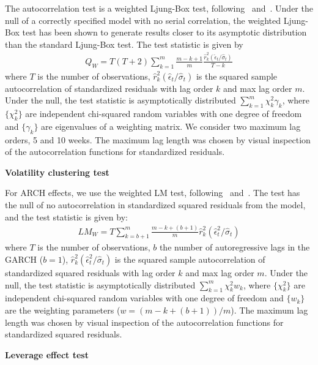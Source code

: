 The autocorrelation test is a weighted Ljung-Box test, following~\textcite{FisherGallagher2012} and~\textcite{LjungBox1978}. Under the null of a correctly specified model with no serial correlation, the weighted Ljung-Box test has been shown to generate results closer to its asymptotic distribution than the standard Ljung-Box test. The test statistic is given by
\begin{align}
  Q_W = T (T+2) \sum\limits^m_{k = 1} \frac{m-k+1}{m} \frac{\hat{r}_{k}^{2} (\hat{\epsilon}_{t} / \hat{\sigma}_{t})}{T-k}
\end{align}
where $T$ is the number of observations, $\hat{r}^{2}_{k} ( \hat{\epsilon}_{t} / \hat{\sigma}_{t} )$ is the squared sample autocorrelation of standardized residuals with lag order $k$ and max lag order $m$. Under the null, the test statistic is asymptotically distributed $\sum\limits^m_{k = 1} \chi^2_k \gamma_k$, where $\{\chi^2_k\}$ are independent chi-squared random variables with one degree of freedom and $\{\gamma_k\}$ are eigenvalues of a weighting matrix. We consider two maximum lag orders, 5 and 10 weeks. The maximum lag length was chosen by visual inspection of the autocorrelation functions for standardized residuals.

\textbf{Volatility clustering test}

For ARCH effects, we use the weighted LM test, following~\textcite{FisherGallagher2012} and~\textcite{LiMak1994}. The test has the null of no autocorrelation in standardized squared residuals from the model, and the test statistic is given by:
\begin{align}
  LM_W = T \sum\limits_{k = b + 1}^{m} \frac{m - k + (b+1)}{m} \hat{r}^{2}_{k} (\hat{\epsilon}^{2}_{t} / \hat{\sigma}_{t})
\end{align}
where $T$ is the number of observations, $b$ the number of autoregressive lags in the GARCH ($b=1$), $\hat{r}^2_k (\hat{\epsilon}^2_t / \hat{\sigma}_t)$ is the squared sample autocorrelation of standardized squared residuals with lag order $k$ and max lag order $m$. Under the null, the test statistic is asymptotically distributed $\sum\limits^m_{k = 1} \chi^2_k w_k$, where $\{\chi^2_k\}$ are independent chi-squared random variables with one degree of freedom and $\{w_k\}$ are the weighting parameters ($w = (m - k + (b+1))/m$). The maximum lag length was chosen by visual inspection of the autocorrelation functions for standardized squared residuals.

\textbf{Leverage effect test}

